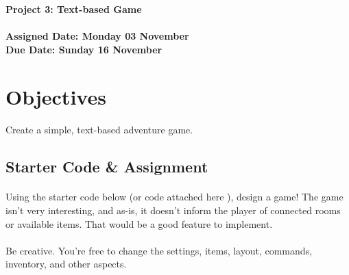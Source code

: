 \documentclass[letter,10pt]{article}
\begin{document}
    
    \huge
    \textbf{Project 3: Text-based Game}
    \normalsize
    \\ ~~ \\
    \textbf{Assigned Date: Monday 03 November} \\
    \textbf{Due Date: Sunday 16 November}
    
    \section*{Objectives}
    \paragraph{}Create a simple, text-based adventure game.
    
    \subsection*{Starter Code \& Assignment}
    \paragraph{}Using the starter code below (or code attached here ), design a game! The game isn't very interesting, and as-is, it doesn't inform the player of connected rooms or available items. That would be a good feature to implement.
    
    \paragraph{}Be creative. You're free to change the settings, items, layout, commands, inventory, and other aspects.
    
\end{document}
